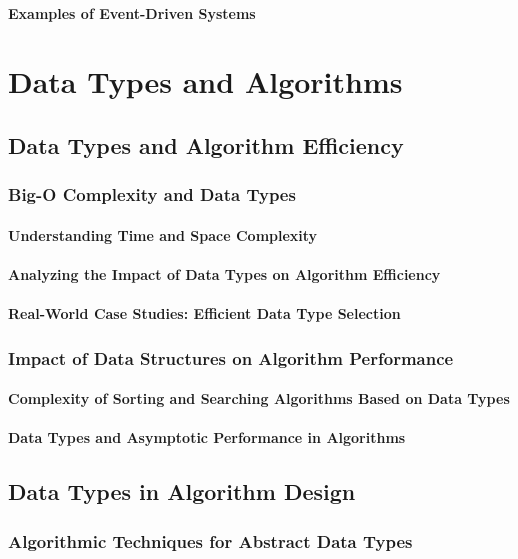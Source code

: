 \documentclass[12pt, oneside]{book}
\begin{document}
\subsubsection{Examples of Event-Driven Systems}

\chapter{Data Types and Algorithms}
\section{Data Types and Algorithm Efficiency}
\subsection{Big-O Complexity and Data Types}
\subsubsection{Understanding Time and Space Complexity}
\subsubsection{Analyzing the Impact of Data Types on Algorithm Efficiency}
\subsubsection{Real-World Case Studies: Efficient Data Type Selection}
\subsection{Impact of Data Structures on Algorithm Performance}
\subsubsection{Complexity of Sorting and Searching Algorithms Based on Data Types}
\subsubsection{Data Types and Asymptotic Performance in Algorithms}
\section{Data Types in Algorithm Design}
\subsection{Algorithmic Techniques for Abstract Data Types}
\end{document}
